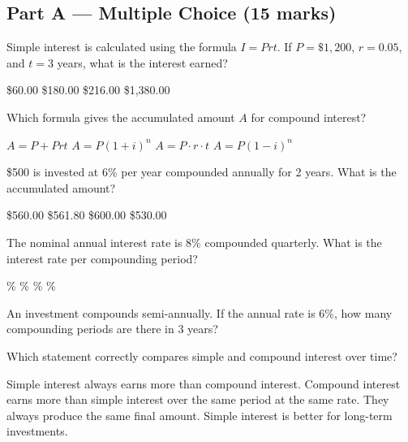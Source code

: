 \documentclass[addpoints]{exam}
\begin{document}
\newpage
\begin{questions}

\section*{Part A --- Multiple Choice (15 marks)}
\vspace{5mm}

\question[1]
Simple interest is calculated using the formula $I = Prt$. If $P = \$1{,}200$, $r = 0.05$, and $t = 3$ years, what is the interest earned?
\begin{choices}
    \choice \$60.00
    \correctchoice \$180.00
    \choice \$216.00
    \choice \$1{,}380.00
\end{choices}

\question[1]
Which formula gives the accumulated amount $A$ for compound interest?
\begin{choices}
    \choice $A = P + Prt$
    \correctchoice $A = P(1+i)^n$
    \choice $A = P \cdot r \cdot t$
    \choice $A = P(1-i)^n$
\end{choices}

\question[1]
\$500 is invested at 6\% per year compounded annually for 2 years. What is the accumulated amount?
\begin{choices}
    \choice \$560.00
    \correctchoice \$561.80
    \choice \$600.00
    \choice \$530.00
\end{choices}

\question[1]
The nominal annual interest rate is 8\% compounded quarterly. What is the interest rate per compounding period?
\begin{choices}
    \%
    \%
    \%
    \%
\end{choices}

\question[1]
An investment compounds semi-annually. If the annual rate is 6\%, how many compounding periods are there in 3 years?
\begin{choices}
\end{choices}

\question[1]
Which statement correctly compares simple and compound interest over time?
\begin{choices}
    \choice Simple interest always earns more than compound interest.
    \correctchoice Compound interest earns more than simple interest over the same period at the same rate.
    \choice They always produce the same final amount.
    \choice Simple interest is better for long-term investments.
\end{choices}


\end{questions}
\end{document}
